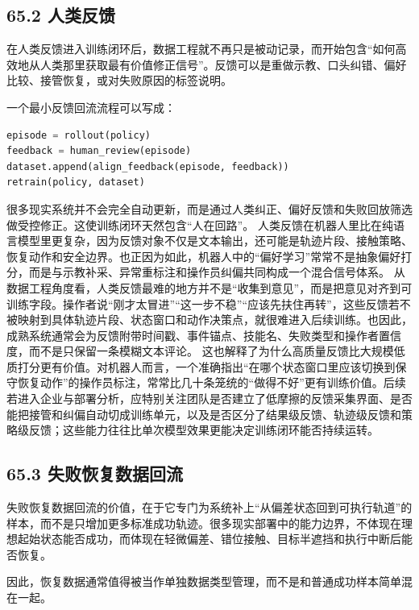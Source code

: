 \subsection*{65.2 人类反馈}


在人类反馈进入训练闭环后，数据工程就不再只是被动记录，而开始包含“如何高效地从人类那里获取最有价值修正信号”。反馈可以是重做示教、口头纠错、偏好比较、接管恢复，或对失败原因的标签说明。

一个最小反馈回流流程可以写成：

\begin{lstlisting}[language=python]
episode = rollout(policy)
feedback = human_review(episode)
dataset.append(align_feedback(episode, feedback))
retrain(policy, dataset)
\end{lstlisting}

很多现实系统并不会完全自动更新，而是通过人类纠正、偏好反馈和失败回放筛选做受控修正。这使训练闭环天然包含“人在回路”。 人类反馈在机器人里比在纯语言模型里更复杂，因为反馈对象不仅是文本输出，还可能是轨迹片段、接触策略、恢复动作和安全边界。也正因为如此，机器人中的“偏好学习”常常不是抽象偏好打分，而是与示教补采、异常重标注和操作员纠偏共同构成一个混合信号体系。 从数据工程角度看，人类反馈最难的地方并不是“收集到意见”，而是把意见对齐到可训练字段。操作者说“刚才太冒进”“这一步不稳”“应该先扶住再转”，这些反馈若不被映射到具体轨迹片段、状态窗口和动作决策点，就很难进入后续训练。也因此，成熟系统通常会为反馈附带时间戳、事件锚点、技能名、失败类型和操作者置信度，而不是只保留一条模糊文本评论。 这也解释了为什么高质量反馈比大规模低质打分更有价值。对机器人而言，一个准确指出“在哪个状态窗口里应该切换到保守恢复动作”的操作员标注，常常比几十条笼统的“做得不好”更有训练价值。后续若进入企业与部署分析，应特别关注团队是否建立了低摩擦的反馈采集界面、是否能把接管和纠偏自动切成训练单元，以及是否区分了结果级反馈、轨迹级反馈和策略级反馈；这些能力往往比单次模型效果更能决定训练闭环能否持续运转。

\subsection*{65.3 失败恢复数据回流}


失败恢复数据回流的价值，在于它专门为系统补上“从偏差状态回到可执行轨道”的样本，而不是只增加更多标准成功轨迹。很多现实部署中的能力边界，不体现在理想起始状态能否成功，而体现在轻微偏差、错位接触、目标半遮挡和执行中断后能否恢复。

因此，恢复数据通常值得被当作单独数据类型管理，而不是和普通成功样本简单混在一起。


